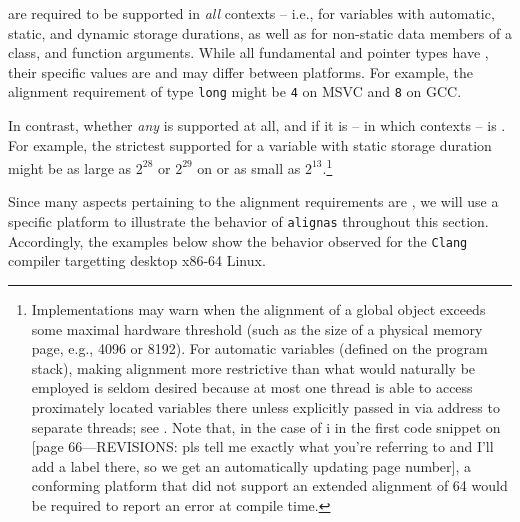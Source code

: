  are required to be supported in \emph{all} contexts -- i.e., for variables with automatic, static, and dynamic storage durations, as well as for non-static data members of a class, and function arguments.  While all fundamental and pointer types have , their specific values are  and may differ between platforms.  For example, the alignment requirement of type \lstinline!long! might be \lstinline!4! on MSVC and \lstinline!8! on GCC. 

In contrast, whether \emph{any}  is supported at all, and if it is -- in which contexts -- is . For example, the strictest supported  for a variable with static storage duration might be as large as $2^{28}$ or $2^{29}$ on or as small as $2^{13}$.\footnote{Implementations may warn when the alignment of a global object exceeds some maximal hardware threshold (such as the size of a physical memory page, e.g., 4096 or 8192).  For automatic variables (defined on the program stack), making alignment more restrictive than what would naturally be employed is seldom desired because at most one thread is able to access proximately located variables there unless explicitly passed in via address to separate threads; see . Note that, in the case of i in the first code snippet on \pageref{}
[page 66---REVISIONS: pls tell me exactly what you're referring to and I'll add a label there, so we get an automatically updating page number], a conforming platform that did not support an extended alignment of 64 would be required to report an error at compile time.}

Since many aspects pertaining to the alignment requirements are , we will use a specific platform to illustrate the behavior of \lstinline!alignas! throughout this section.  Accordingly, the examples below show the behavior observed for the \lstinline!Clang! compiler targetting desktop x86-64 Linux. 


